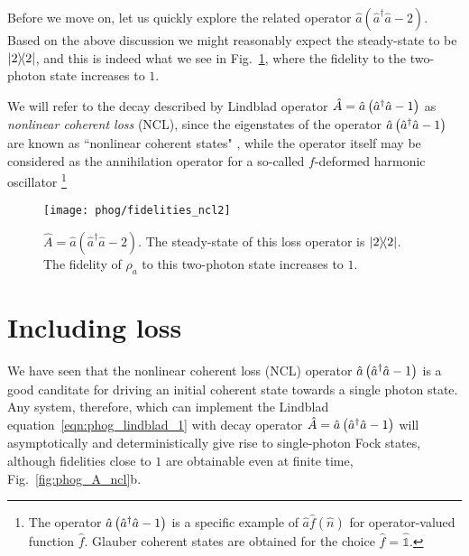 Before we move on, let us quickly explore the related operator $\hat{a}\left(\hat{a}^\dagger \hat{a} -2\right)$. Based on the above discussion we might reasonably expect the steady-state to be $\dyad{2}$, and this is indeed what we see in Fig.~\ref{fig:phog_A_ncl2}, where the fidelity to the two-photon state increases to $1$. 

We will refer to the decay described by Lindblad operator $\hat{A} = \hat{a}\left(\hat{a}^\dagger \hat{a} - 1\right)$ as \emph{nonlinear coherent loss} (NCL), since the eigenstates of the operator $\hat{a}\left(\hat{a}^\dagger \hat{a} - 1\right)$ are known as ``nonlinear coherent states" \cite{Manko1997}, while the operator itself may be considered as the annihilation operator for a so-called $f$-deformed harmonic oscillator \cite{Filho1996}\footnote{The operator $\hat{a}\left(\hat{a}^\dagger \hat{a} - 1\right)$ is a specific example of $\hat{a} \hat{f}\left(\hat{n}\right)$ for operator-valued function $\hat{f}$. Glauber coherent states are obtained for the choice $\hat{f} = \hat{\mathds{1}}$.}

\begin{figure}[htp]
\centering
\texttt{[image: phog/fidelities\_ncl2]}
\caption{\label{fig:phog_A_ncl2} $\hat{A} = \hat{a}\left(\hat{a}^\dagger \hat{a} - 2\right)$. The steady-state of this loss operator is $\dyad{2}$. The fidelity of $\rho_a$ to this two-photon state increases to $1$.}
\end{figure}



\clearpage
\section{Including loss}\label{sec:phog_including_loss}
We have seen that the nonlinear coherent loss (NCL) operator $\hat{a}\left(\hat{a}^\dagger \hat{a} - 1\right)$ is a good canditate for driving an initial coherent state towards a single photon state. Any system, therefore, which can implement the Lindblad equation~\ref{eqn:phog_lindblad_1} with decay operator $\hat{A} = \hat{a}\left(\hat{a}^\dagger \hat{a} - 1\right)$ will asymptotically and deterministically give rise to single-photon Fock states, although fidelities close to $1$ are obtainable even at finite time, Fig.~\ref{fig:phog_A_ncl}b. 

